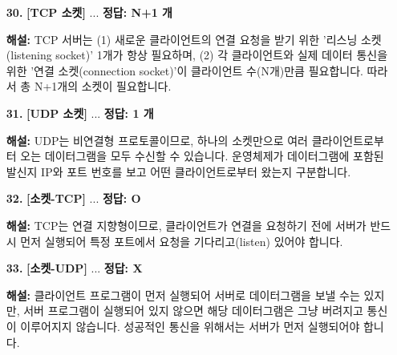 \documentclass[a4paper, 10pt]{article}
\begin{document}
\begin{enumerate}[itemsep=2.5em, leftmargin=2em, label={}]
\item[\textbf{30.}] \textbf{[TCP 소켓]} ...
\vspace{0.5em}
\noindent\textbf{정답: N+1 개} \par
\small\textbf{해설:} TCP 서버는 (1) 새로운 클라이언트의 연결 요청을 받기 위한 '리스닝 소켓(listening socket)' 1개가 항상 필요하며, (2) 각 클라이언트와 실제 데이터 통신을 위한 '연결 소켓(connection socket)'이 클라이언트 수(N개)만큼 필요합니다. 따라서 총 N+1개의 소켓이 필요합니다.

\item[\textbf{31.}] \textbf{[UDP 소켓]} ...
\vspace{0.5em}
\noindent\textbf{정답: 1 개} \par
\small\textbf{해설:} UDP는 비연결형 프로토콜이므로, 하나의 소켓만으로 여러 클라이언트로부터 오는 데이터그램을 모두 수신할 수 있습니다. 운영체제가 데이터그램에 포함된 발신지 IP와 포트 번호를 보고 어떤 클라이언트로부터 왔는지 구분합니다.

\item[\textbf{32.}] \textbf{[소켓-TCP]} ...
\vspace{0.5em}
\noindent\textbf{정답: O} \par
\small\textbf{해설:} TCP는 연결 지향형이므로, 클라이언트가 연결을 요청하기 전에 서버가 반드시 먼저 실행되어 특정 포트에서 요청을 기다리고(listen) 있어야 합니다.

\item[\textbf{33.}] \textbf{[소켓-UDP]} ...
\vspace{0.5em}
\noindent\textbf{정답: X} \par
\small\textbf{해설:} 클라이언트 프로그램이 먼저 실행되어 서버로 데이터그램을 보낼 수는 있지만, 서버 프로그램이 실행되어 있지 않으면 해당 데이터그램은 그냥 버려지고 통신이 이루어지지 않습니다. 성공적인 통신을 위해서는 서버가 먼저 실행되어야 합니다.


\end{enumerate}
\end{document}
